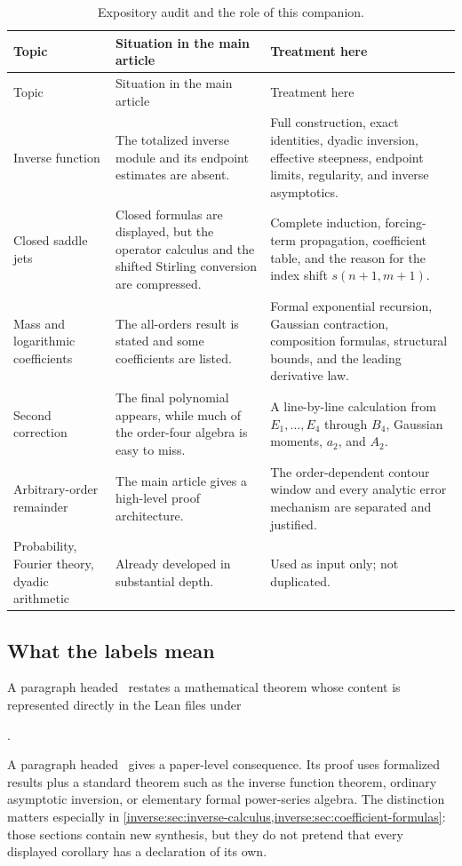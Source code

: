 \documentclass[11pt,oneside]{article}
\theoremstyle{definition}
\theoremstyle{remark}
\begin{document}
\begin{longtable}{>{\raggedright\arraybackslash}p{}
                  >{\raggedright\arraybackslash}p{}
                  >{\raggedright\arraybackslash}p{}}
\caption{Expository audit and the role of this companion.}
\label{inverse:tab:audit}\\
\toprule
Topic & Situation in the main article & Treatment here\\
\midrule
\endfirsthead
\toprule
Topic & Situation in the main article & Treatment here\\
\midrule
\endhead
Inverse function & The totalized inverse module and its endpoint estimates
are absent. & Full construction, exact identities, dyadic inversion,
effective steepness, endpoint limits, regularity, and inverse
asymptotics.\\
Closed saddle jets & Closed formulas are displayed, but the operator
calculus and the shifted Stirling conversion are compressed. & Complete
induction, forcing-term propagation, coefficient table, and the reason for
the index shift $s(n+1,m+1)$.\\
Mass and logarithmic coefficients & The all-orders result is stated and
some coefficients are listed. & Formal exponential recursion, Gaussian
contraction, composition formulas, structural bounds, and the leading
derivative law.\\
Second correction & The final polynomial appears, while much of the
order-four algebra is easy to miss. & A line-by-line calculation from
$E_1,\dots,E_4$ through $B_4$, Gaussian moments, $a_2$, and $A_2$.\\
Arbitrary-order remainder & The main article gives a high-level proof
architecture. & The order-dependent contour window and every analytic
error mechanism are separated and justified.\\
Probability, Fourier theory, dyadic arithmetic & Already developed in
substantial depth. & Used as input only; not duplicated.\\
\bottomrule
\end{longtable}

\subsection{What the labels mean}

A paragraph headed \Formalized\ restates a mathematical theorem whose
content is represented directly in the Lean files under
\begin{center}
.
\end{center}
A paragraph headed \Derived\ gives a paper-level consequence.  Its proof
uses formalized results plus a standard theorem such as the inverse
function theorem, ordinary asymptotic inversion, or elementary formal
power-series algebra.  The distinction matters especially in
\cref{inverse:sec:inverse-calculus,inverse:sec:coefficient-formulas}: those sections contain
new synthesis, but they do not pretend that every displayed corollary has
a declaration of its own.
\end{document}
